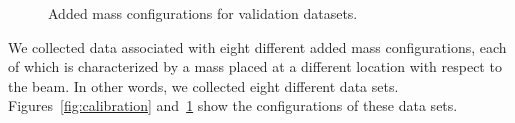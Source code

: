 \begin{figure}[t]
\centering
{}
 \newline 
{}
\caption{Added mass configurations for validation datasets.}
\label{fig:validation_masses}
\end{figure}


We collected data associated with eight different added mass configurations, each of which is characterized by a mass placed at a different 
location with respect to the beam. In other words, 
we collected eight different data sets. Figures~\ref{fig:calibration} and~\ref{fig:validation_masses} show the configurations of these data sets.

